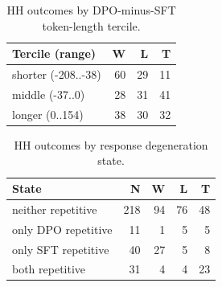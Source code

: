 \begin{table}[H]\centering\footnotesize\caption{HH outcomes by DPO-minus-SFT token-length tercile.}\label{tab:hh-length}\begin{tabular}{lrrr}\toprule Tercile (range)&W&L&T\\\midrule
shorter (-208..-38)&60&29&11\\
middle (-37..0)&28&31&41\\
longer (0..154)&38&30&32\\
\bottomrule\end{tabular}\end{table}
\begin{table}[H]\centering\footnotesize\caption{HH outcomes by response degeneration state.}\label{tab:hh-repetition}\begin{tabular}{lrrrr}\toprule State&N&W&L&T\\\midrule
neither repetitive&218&94&76&48\\
only DPO repetitive&11&1&5&5\\
only SFT repetitive&40&27&5&8\\
both repetitive&31&4&4&23\\
\bottomrule\end{tabular}\end{table}

